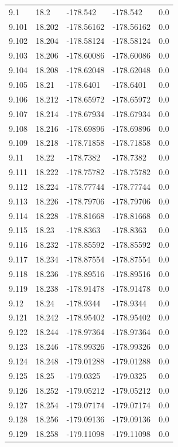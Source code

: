 \begin{tabular}{lllll}
9.1 & 18.2 & -178.542 & -178.542 & 0.0 \\
9.101 & 18.202 & -178.56162 & -178.56162 & 0.0 \\
9.102 & 18.204 & -178.58124 & -178.58124 & 0.0 \\
9.103 & 18.206 & -178.60086 & -178.60086 & 0.0 \\
9.104 & 18.208 & -178.62048 & -178.62048 & 0.0 \\
9.105 & 18.21 & -178.6401 & -178.6401 & 0.0 \\
9.106 & 18.212 & -178.65972 & -178.65972 & 0.0 \\
9.107 & 18.214 & -178.67934 & -178.67934 & 0.0 \\
9.108 & 18.216 & -178.69896 & -178.69896 & 0.0 \\
9.109 & 18.218 & -178.71858 & -178.71858 & 0.0 \\
9.11 & 18.22 & -178.7382 & -178.7382 & 0.0 \\
9.111 & 18.222 & -178.75782 & -178.75782 & 0.0 \\
9.112 & 18.224 & -178.77744 & -178.77744 & 0.0 \\
9.113 & 18.226 & -178.79706 & -178.79706 & 0.0 \\
9.114 & 18.228 & -178.81668 & -178.81668 & 0.0 \\
9.115 & 18.23 & -178.8363 & -178.8363 & 0.0 \\
9.116 & 18.232 & -178.85592 & -178.85592 & 0.0 \\
9.117 & 18.234 & -178.87554 & -178.87554 & 0.0 \\
9.118 & 18.236 & -178.89516 & -178.89516 & 0.0 \\
9.119 & 18.238 & -178.91478 & -178.91478 & 0.0 \\
9.12 & 18.24 & -178.9344 & -178.9344 & 0.0 \\
9.121 & 18.242 & -178.95402 & -178.95402 & 0.0 \\
9.122 & 18.244 & -178.97364 & -178.97364 & 0.0 \\
9.123 & 18.246 & -178.99326 & -178.99326 & 0.0 \\
9.124 & 18.248 & -179.01288 & -179.01288 & 0.0 \\
9.125 & 18.25 & -179.0325 & -179.0325 & 0.0 \\
9.126 & 18.252 & -179.05212 & -179.05212 & 0.0 \\
9.127 & 18.254 & -179.07174 & -179.07174 & 0.0 \\
9.128 & 18.256 & -179.09136 & -179.09136 & 0.0 \\
9.129 & 18.258 & -179.11098 & -179.11098 & 0.0 \\

\end{tabular}
